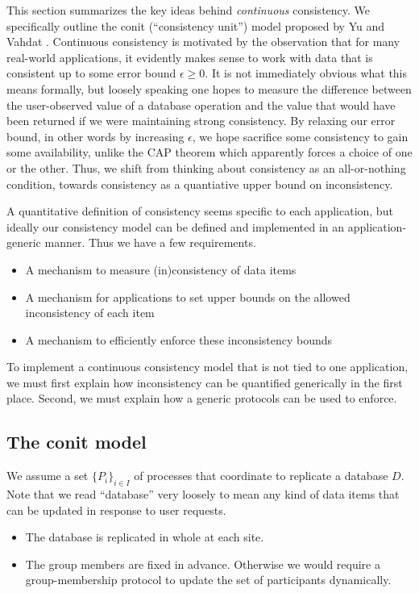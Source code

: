 \documentclass[]             %
{NASA}                       %
\theoremstyle{definition}
\begin{document}
This section summarizes the key ideas behind \emph{continuous}
consistency. We specifically outline the conit (``consistency unit'')
model proposed by Yu and Vahdat \citationneeded. Continuous
consistency is motivated by the observation that for many real-world
applications, it evidently makes sense to work with data that is
consistent up to some error bound $\epsilon \geq 0$. It is not
immediately obvious what this means formally, but loosely speaking one
hopes to measure the difference between the user-observed value of a
database operation and the value that would have been returned if we
were maintaining strong consistency. By relaxing our error bound, in
other words by increasing $\epsilon$, we hope sacrifice some
consistency to gain some availability, unlike the CAP theorem which
apparently forces a choice of one or the other. Thus, we shift from
thinking about consistency as an all-or-nothing condition, towards
consistency as a quantiative upper bound on inconsistency.

A quantitative definition of consistency seems specific to each
application, but ideally our consistency model can be defined and
implemented in an application-generic manner. Thus we have a few
requirements.
\begin{itemize}
\item A mechanism to measure (in)consistency of data items
\item A mechanism for applications to set upper bounds on the allowed
  inconsistency of each item
\item A mechanism to efficiently enforce these inconsistency bounds
\end{itemize}

To implement a continuous consistency model that is not tied to one
application, we must first explain how inconsistency can be quantified
generically in the first place. Second, we must explain how a generic
protocols can be used to enforce.

\subsection{The conit model}
\label{ssec:conits}

We assume a set $\{P_i\}_{i \in I}$ of processes that coordinate to
replicate a database $D$. Note that we read ``database'' very loosely
to mean any kind of data items that can be updated in response to user
requests.

\begin{itemize}
\item The database is replicated in whole at each site.
\item The group members are fixed in advance. Otherwise we would
  require a group-membership protocol to update the set of
  participants dynamically.
\end{itemize}
\end{document}
